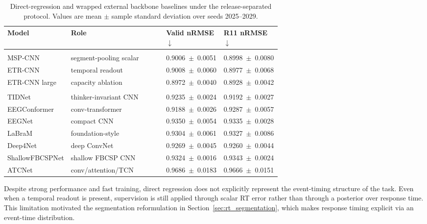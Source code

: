 \documentclass[12pt]{article}
\begin{document}
\begin{table}[!t]
\centering
\caption{Direct-regression and wrapped external backbone baselines under the release-separated protocol. Values are mean $\pm$ sample standard deviation over seeds 2025--2029.}
\label{tab:r11_regression_baselines}
\footnotesize
\setlength{\tabcolsep}{2pt}
\renewcommand{\arraystretch}{1.15}
\begin{tabularx}{\linewidth}{@{} >{\RaggedRight\arraybackslash}p{0.22\linewidth} Y >{\centering\arraybackslash}p{0.215\linewidth} >{\centering\arraybackslash}p{0.215\linewidth} @{}}
\toprule
\textbf{Model} & \textbf{Role} & \textbf{Valid nRMSE} $\downarrow$ & \textbf{R11 nRMSE} $\downarrow$ \\
\midrule
{} \\
\addlinespace[0.15em]
MSP-CNN & segment-pooling scalar & \mbox{0.9006 $\pm$ 0.0051} & \mbox{0.8998 $\pm$ 0.0080} \\
ETR-CNN & temporal readout & \mbox{0.9008 $\pm$ 0.0060} & \mbox{0.8977 $\pm$ 0.0068} \\
ETR-CNN large & capacity ablation & \mbox{0.8972 $\pm$ 0.0040} & \mbox{0.8928 $\pm$ 0.0042} \\
\midrule
{} \\
\addlinespace[0.15em]
TIDNet & thinker-invariant CNN & \mbox{0.9235 $\pm$ 0.0024} & \mbox{0.9192 $\pm$ 0.0027} \\
EEGConformer & conv-transformer & \mbox{0.9188 $\pm$ 0.0026} & \mbox{0.9287 $\pm$ 0.0057} \\
EEGNet & compact CNN & \mbox{0.9350 $\pm$ 0.0054} & \mbox{0.9335 $\pm$ 0.0028} \\
LaBraM & foundation-style & \mbox{0.9304 $\pm$ 0.0061} & \mbox{0.9327 $\pm$ 0.0086} \\
Deep4Net & deep ConvNet & \mbox{0.9269 $\pm$ 0.0045} & \mbox{0.9260 $\pm$ 0.0044} \\
ShallowFBCSPNet & shallow FBCSP CNN & \mbox{0.9324 $\pm$ 0.0016} & \mbox{0.9343 $\pm$ 0.0024} \\
ATCNet & conv/attention/TCN & \mbox{0.9686 $\pm$ 0.0183} & \mbox{0.9666 $\pm$ 0.0151} \\
\bottomrule
\end{tabularx}
\end{table}

Despite strong performance and fast training, direct regression does not explicitly represent the event-timing structure
of the task. Even when a temporal readout is present, supervision is still applied through scalar RT error rather than
through a posterior over response time. This limitation motivated the segmentation reformulation in
Section~\ref{sec:rt_segmentation}, which makes response timing explicit via an event-time distribution.
\end{document}
